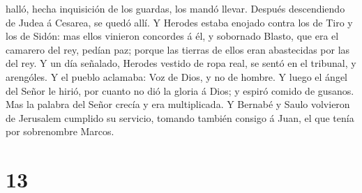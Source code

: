 halló, hecha inquisición de los guardas, los mandó llevar. Después
descendiendo de Judea á Cesarea, se quedó allí.  Y
Herodes estaba enojado contra los de Tiro y los de Sidón: mas ellos
vinieron concordes á él, y sobornado Blasto, que era el camarero del
rey, pedían paz; porque las tierras de ellos eran abastecidas por las
del rey.  Y un día señalado, Herodes vestido de ropa
real, se sentó en el tribunal, y arengóles.  Y el pueblo
aclamaba: Voz de Dios, y no de hombre.  Y luego el ángel
del Señor le hirió, por cuanto no dió la gloria á Dios; y espiró comido
de gusanos.  Mas la palabra del Señor crecía y era
multiplicada.  Y Bernabé y Saulo volvieron de Jerusalem
cumplido su servicio, tomando también consigo á Juan, el que tenía por
sobrenombre Marcos.

\hypertarget{section-12}{%
\section{13}\label{section-12}}


